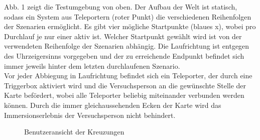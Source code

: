 \documentclass{Paper}
\begin{document}
Abb. 1 zeigt die Testumgebung von oben. Der Aufbau der Welt ist statisch, sodass ein System aus Teleportern (roter Punkt) die verschiedenen Reihenfolgen der Szenarien ermöglicht. Es gibt vier mögliche Startpunkte (blaues x), wobei pro Durchlauf je nur einer aktiv ist.
Welcher Startpunkt gewählt wird ist von der verwendeten Reihenfolge der Szenarien abhängig. Die Laufrichtung ist entgegen des Uhrzeigersinns vorgegeben und der zu erreichende Endpunkt befindet sich immer jeweils hinter dem letzten durchlaufenen Szenario.\\
Vor jeder Abbiegung in Laufrichtung befindet sich ein Teleporter, der durch eine Triggerbox aktiviert wird und die Versuchsperson an die gewünschte Stelle der Karte befördert, wobei alle Teleporter beliebig miteinander verbunden werden können. Durch die immer gleichaussehenden Ecken der Karte wird das Immersionserlebnis der Versuchsperson nicht behindert. 




\begin{figure}[H]



	\caption{Benutzeransicht der Kreuzungen}
	
\end{figure}
\end{document}
